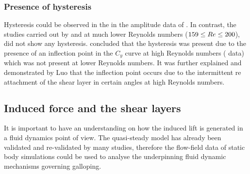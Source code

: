 \subsubsection*{Presence of hysteresis}

Hysteresis could be observed in the in the amplitude data of \cite{Parkinson1964}. In contrast, the studies carried out by \citet{Barrero-Gil2009} and \citet{Joly2012} at much lower Reynolds numbers ($159\leq Re\leq 200$), did not show any hysteresis. \citet{Luo2003} concluded that the hysteresis was present due to the presence of an inflection point in the $C_y$ curve at high Reynolds numbers (\citet{Parkinson1964} data) which was not present at lower Reynolds numbers. It was further explained and demonstrated by Luo that the inflection point occurs due to the intermittent re attachment of the shear layer in certain angles at high Reynolds numbers. 





\subsection{Induced force and the shear layers}
\label{subsec:c_y and shear layers}

It is important to have an understanding on how the induced lift is generated in a fluid dynamics point of view. The quasi-steady model has already been validated and re-validated by many studies, therefore the flow-field data of static body simulations could be used to analyse the underpinning fluid dynamic mechanisms governing galloping.



